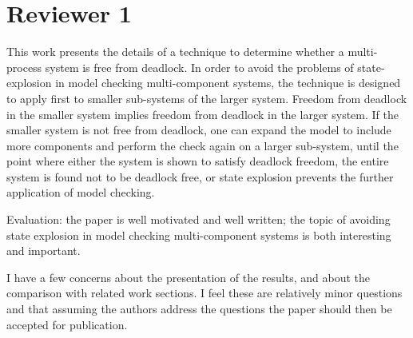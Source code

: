 \section{Reviewer 1}
This work presents the details of a technique to determine whether a multi-process system
is free from deadlock. In order to avoid the problems of state-explosion in model checking
multi-component systems, the technique is designed to apply first to smaller sub-systems
of the larger system.  Freedom from deadlock in the smaller system implies freedom
from deadlock in the larger system.  If the smaller system is not free from deadlock,
one can expand the model to include more components and perform the check again on
a larger sub-system, until the point where either the system is shown to satisfy deadlock
freedom, the entire system is found not to be deadlock free,  or state explosion prevents
the further application of model checking.


Evaluation: the paper is well motivated and well written; the topic of
avoiding state explosion in model checking multi-component systems
is both interesting and important.

I have a few concerns about the presentation of the results, and about the
comparison with related work sections.  I feel these are relatively minor
questions and that assuming the authors address the questions the paper should
then be accepted for publication.

